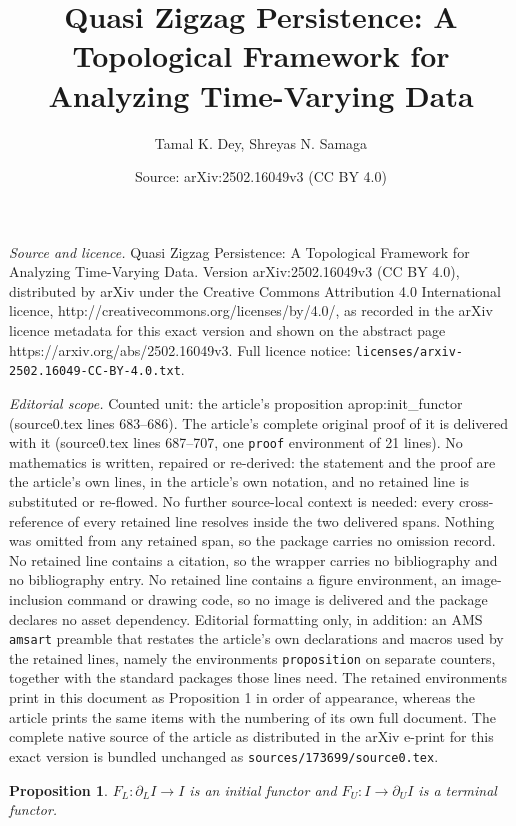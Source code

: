 \documentclass[10pt,a4paper]{amsart}
\title{Quasi Zigzag Persistence: A Topological Framework for Analyzing Time-Varying Data}
\author{Tamal K. Dey, Shreyas N. Samaga}
\date{Source: arXiv:2502.16049v3 (CC BY 4.0)}
\newtheorem{proposition}{Proposition}
\begin{document}
\maketitle

\noindent\emph{Source and licence.} Quasi Zigzag Persistence: A Topological Framework for Analyzing Time-Varying Data. Version arXiv:2502.16049v3 (CC BY 4.0), distributed by arXiv under the Creative Commons Attribution 4.0 International licence, http://creativecommons.org/licenses/by/4.0/, as recorded in the arXiv licence metadata for this exact version and shown on the abstract page https://arxiv.org/abs/2502.16049v3. Full licence notice: \texttt{licenses/arxiv-2502.16049-CC-BY-4.0.txt}.\par\smallskip

\noindent\textit{Editorial scope.} Counted unit: the article's proposition aprop:init\_functor (source0.tex lines 683--686). The article's complete original proof of it is delivered with it (source0.tex lines 687--707, one \texttt{proof} environment of 21 lines). No mathematics is written, repaired or re-derived: the statement and the proof are the article's own lines, in the article's own notation, and no retained line is substituted or re-flowed.  No further source-local context is needed: every cross-reference of every retained line resolves inside the two delivered spans.  Nothing was omitted from any retained span, so the package carries no omission record.  No retained line contains a citation, so the wrapper carries no bibliography and no bibliography entry.  No retained line contains a figure environment, an image-inclusion command or drawing code, so no image is delivered and the package declares no asset dependency.  Editorial formatting only, in addition: an AMS \texttt{amsart} preamble that restates the article's own declarations and macros used by the retained lines, namely the environments \texttt{proposition} on separate counters, together with the standard packages those lines need.  The retained environments print in this document as Proposition 1 in order of appearance, whereas the article prints the same items with the numbering of its own full document.  The complete native source of the article as distributed in the arXiv e-print for this exact version is bundled unchanged as \texttt{sources/173699/source0.tex}.
\begin{proposition}
\label{aprop:init_functor}
    $F_L: \partial_L I\rightarrow I$  is an initial functor and $F_U: I\rightarrow \partial_U I$ is a terminal functor.
\end{proposition}
\end{document}
